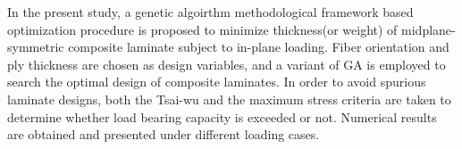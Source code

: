 In the present study,  a genetic algoirthm methodological framework based
optimization procedure is proposed to minimize thickness(or weight) of
midplane-symmetric composite laminate subject to in-plane loading. Fiber
orientation and ply thickness are chosen as design variables, and a variant of GA is 
employed to search the optimal design of composite laminates.  In order to avoid
spurious laminate designs, both the Tsai-wu and the maximum stress criteria are
taken to determine whether load bearing capacity is exceeded or not. Numerical
results are obtained and presented under different loading cases.
